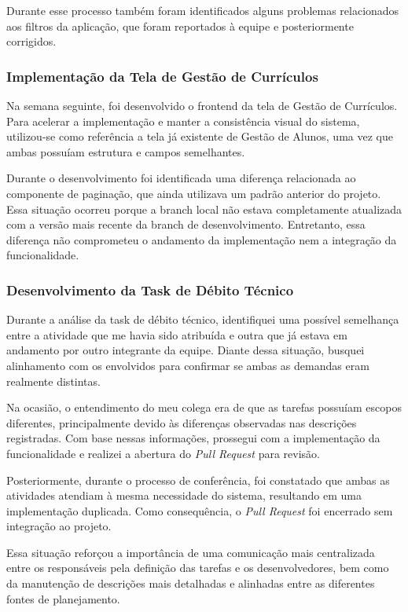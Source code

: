 Durante esse processo também foram identificados alguns problemas relacionados aos
filtros da aplicação, que foram reportados à equipe e posteriormente corrigidos.

\subsubsection*{Implementação da Tela de Gestão de Currículos}

Na semana seguinte, foi desenvolvido o frontend da tela de Gestão de Currículos. Para
acelerar a implementação e manter a consistência visual do sistema, utilizou-se como
referência a tela já existente de Gestão de Alunos, uma vez que ambas possuíam
estrutura e campos semelhantes.

Durante o desenvolvimento foi identificada uma diferença relacionada ao componente de
paginação, que ainda utilizava um padrão anterior do projeto. Essa situação ocorreu
porque a branch local não estava completamente atualizada com a versão mais recente
da branch de desenvolvimento. Entretanto, essa diferença não comprometeu o andamento
da implementação nem a integração da funcionalidade.

\subsubsection*{Desenvolvimento da Task de Débito Técnico}

Durante a análise da task de débito técnico, identifiquei uma possível semelhança entre
a atividade que me havia sido atribuída e outra que já estava em andamento por outro
integrante da equipe. Diante dessa situação, busquei alinhamento com os envolvidos
para confirmar se ambas as demandas eram realmente distintas.

Na ocasião, o entendimento do meu colega era de que as tarefas possuíam escopos
diferentes, principalmente devido às diferenças observadas nas descrições registradas.
Com base nessas informações, prossegui com a implementação da funcionalidade e
realizei a abertura do \textit{Pull Request} para revisão.

Posteriormente, durante o processo de conferência, foi constatado que ambas as
atividades atendiam à mesma necessidade do sistema, resultando em uma implementação
duplicada. Como consequência, o \textit{Pull Request} foi encerrado sem integração ao
projeto.

Essa situação reforçou a importância de uma comunicação mais centralizada entre os
responsáveis pela definição das tarefas e os desenvolvedores, bem como da manutenção
de descrições mais detalhadas e alinhadas entre as diferentes fontes de planejamento.

